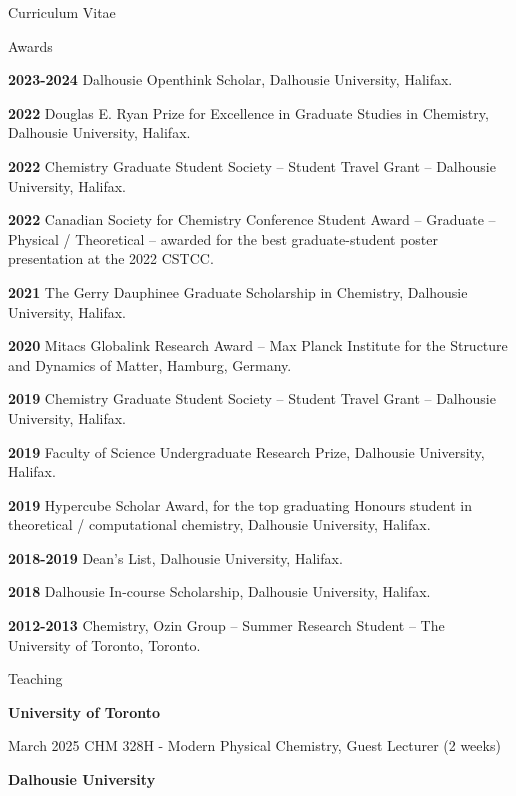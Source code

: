 \documentclass[a4paper,oneside,11pt]{article}
\begin{document}
\begin{cv}{Curriculum Vitae}
  \setlength{\cvlabelwidth}{2.0cm}\begin{cvlist}{Awards}
  \item[{\bf 2023-2024}] Dalhousie Openthink Scholar, Dalhousie University, Halifax.
  \item[{\bf 2022}] Douglas E. Ryan Prize for Excellence in Graduate Studies in Chemistry, Dalhousie University, Halifax.
  \item[{\bf 2022}] Chemistry Graduate Student Society -- Student
    Travel Grant --  Dalhousie University, Halifax.
    \item[{\bf 2022}] Canadian Society for Chemistry Conference Student
    Award --  Graduate -- Physical / Theoretical -- awarded for the best graduate-student poster presentation at the 2022 CSTCC. 
    \item[{\bf 2021}] The Gerry Dauphinee Graduate Scholarship in Chemistry, Dalhousie University, Halifax.
    \item[{\bf 2020}] Mitacs Globalink Research Award -- 
    Max Planck Institute for the Structure and Dynamics of Matter, Hamburg, Germany.
    \item[{\bf 2019}] Chemistry Graduate Student Society -- Student
    Travel Grant -- Dalhousie University, Halifax.
    \item[{\bf 2019}] Faculty of Science Undergraduate Research Prize, Dalhousie University, Halifax.
    \item[{\bf 2019}] Hypercube Scholar Award, for the top graduating Honours student in theoretical / computational chemistry, Dalhousie University, Halifax.
    \item[{\bf 2018-2019}] Dean's List, Dalhousie University, Halifax.
    \item[{\bf 2018}] Dalhousie In-course Scholarship, Dalhousie University, Halifax.
    \item[{\bf 2012-2013}] Chemistry, Ozin Group -- Summer Research Student -- The University of Toronto, Toronto.
  \end{cvlist}

\setlength{\cvlabelwidth}{4.0cm} \begin{cvlist}{Teaching}
    \item[{\bf University of Toronto}]

    \item[March 2025] CHM 328H - Modern Physical Chemistry, Guest Lecturer (2 weeks)
    
    \item[{\bf Dalhousie University}]
    

\end{cvlist}
\end{cv}
\end{document}
